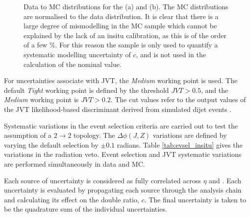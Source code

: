 \begin{figure}[t]
\begin{subfigure}[b]{0.48\textwidth}
    \caption{}
    \label{fig:insitupt:b}
\end{subfigure}
\caption{Data to MC distributions for the \ptJ (a) and \ptref (b). The MC distributions are normalised to the data distribution. It is clear that there is a large degree of mismodelling in the \POWPY MC sample which cannot be explained by the lack of an insitu calibration, as this is of the order of a few \%. For this reason the \POWPY sample is only used to quantify a systematic modelling uncertainty of $c$, and is not used in the calculation of the nominal value.\label{fig:insitu:mismodelling}}%
\end{figure}

For uncertainties associate with JVT, the \textit{Medium} working point is used. The default \textit{Tight} working point is defined by the threshold $JVT > 0.5$, and the \textit{Medium} working point is $JVT > 0.2$. The cut values refer to the output values of the JVT likelihood-based discriminant derived from simulated dijet events \cite{Insitu:JVT}.

Systematic variations in the event selection criteria are carried out to test the assumption of a $2\rightarrow2$ topology. The $\Delta\phi(J,Z)$ variations are defined by varying the default selection by $\pm0.1$ radians. Table \ref{tab:evsel_insitu} gives the variations in the radiation veto. Event selection and JVT systematic variations are performed simultaneously in data and MC. 

Each source of uncertainty is considered as fully correlated across $\eta$ and \pt. Each uncertainty is evaluated by propagating each source through the analysis chain and calculating its effect on the double ratio, $c$. The final uncertainty is taken to be the quadrature sum of the individual uncertainties.


